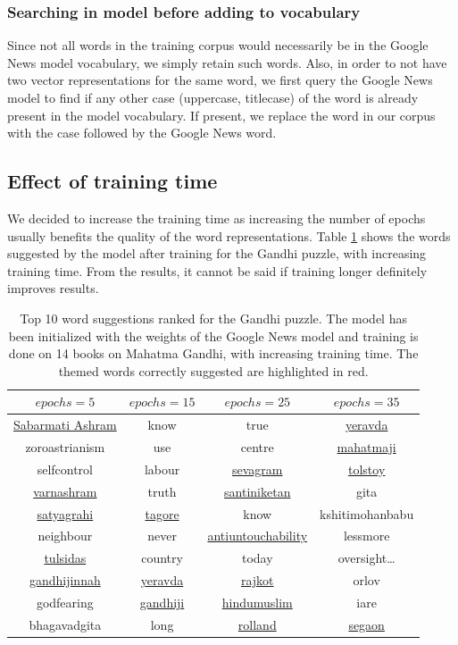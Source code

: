 \documentclass[twoside]{article}
\begin{document}
\subsubsection{Searching in model before adding to vocabulary}
Since not all words in the training corpus would necessarily be in the Google News model vocabulary, we simply retain such words. Also, in order to not have two vector representations for the same word, we first query the Google News model to find if any other case (uppercase, titlecase) of the word is already present in the model vocabulary. If present, we replace the word in our corpus with the case followed by the Google News word.

\subsection{Effect of training time}
We decided to increase the training time as increasing the number of epochs usually benefits the quality of the word representations. Table \ref{tab:table12} shows the words suggested by the model after training for the Gandhi puzzle, with increasing training time. From the results, it cannot be said if training longer definitely improves results.

\begin{table}[h!]
  \begin{center}
    \begin{tabular}{c c c c}
      \toprule
      \textbf{$epochs=5$} & \textbf{$epochs=15$} & \textbf{$epochs=25$} & \textbf{$epochs=35$}  \\ 
      \midrule
      \ul{Sabarmati Ashram} & know & true & \ul{yeravda} \\
      zoroastrianism & use & centre & \ul{mahatmaji}\\
      selfcontrol & labour & \ul{sevagram} & \ul{tolstoy}\\
      \ul{varnashram} & truth & \ul{santiniketan} & gita\\
      \ul{satyagrahi} & \ul{tagore} & know & kshitimohanbabu\\
      neighbour & never & \ul{antiuntouchability} & lessmore\\
      \ul{tulsidas} & country & today & oversight…\\
      \ul{gandhijinnah} & \ul{yeravda} & \ul{rajkot} & orlov\\
      godfearing & \ul{gandhiji} & \ul{hindumuslim} & iare\\
      bhagavadgita & long & \ul{rolland} & \ul{segaon} \\
      \bottomrule
    \end{tabular}
    \caption{Top 10 word suggestions ranked for the Gandhi puzzle. The model has been initialized with the weights of the Google News model and training is done on 14 books on Mahatma Gandhi, with increasing training time. The themed words correctly suggested are highlighted in red.}
    \label{tab:table12}
  \end{center}
\end{table} 
\end{document}
